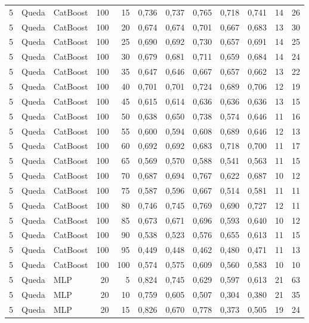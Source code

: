 \begin{longtable}{@{}rllrrrrrrrrr@{}}
5 & Queda & CatBoost & 100 & 15 & 0,736 & 0,737 & 0,765 & 0,718 & 0,741 & 14 & 26 \\
5 & Queda & CatBoost & 100 & 20 & 0,674 & 0,674 & 0,701 & 0,667 & 0,683 & 13 & 30 \\
5 & Queda & CatBoost & 100 & 25 & 0,690 & 0,692 & 0,730 & 0,657 & 0,691 & 14 & 25 \\
5 & Queda & CatBoost & 100 & 30 & 0,679 & 0,681 & 0,711 & 0,659 & 0,684 & 14 & 24 \\
5 & Queda & CatBoost & 100 & 35 & 0,647 & 0,646 & 0,667 & 0,657 & 0,662 & 13 & 22 \\
5 & Queda & CatBoost & 100 & 40 & 0,701 & 0,701 & 0,724 & 0,689 & 0,706 & 12 & 19 \\
5 & Queda & CatBoost & 100 & 45 & 0,615 & 0,614 & 0,636 & 0,636 & 0,636 & 13 & 15 \\
5 & Queda & CatBoost & 100 & 50 & 0,638 & 0,650 & 0,738 & 0,574 & 0,646 & 11 & 16 \\
5 & Queda & CatBoost & 100 & 55 & 0,600 & 0,594 & 0,608 & 0,689 & 0,646 & 12 & 13 \\
5 & Queda & CatBoost & 100 & 60 & 0,692 & 0,692 & 0,683 & 0,718 & 0,700 & 11 & 17 \\
5 & Queda & CatBoost & 100 & 65 & 0,569 & 0,570 & 0,588 & 0,541 & 0,563 & 11 & 15 \\
5 & Queda & CatBoost & 100 & 70 & 0,687 & 0,694 & 0,767 & 0,622 & 0,687 & 10 & 12 \\
5 & Queda & CatBoost & 100 & 75 & 0,587 & 0,596 & 0,667 & 0,514 & 0,581 & 11 & 11 \\
5 & Queda & CatBoost & 100 & 80 & 0,746 & 0,745 & 0,769 & 0,690 & 0,727 & 12 & 11 \\
5 & Queda & CatBoost & 100 & 85 & 0,673 & 0,671 & 0,696 & 0,593 & 0,640 & 10 & 12 \\
5 & Queda & CatBoost & 100 & 90 & 0,538 & 0,523 & 0,576 & 0,655 & 0,613 & 11 & 15 \\
5 & Queda & CatBoost & 100 & 95 & 0,449 & 0,448 & 0,462 & 0,480 & 0,471 & 11 & 13 \\
5 & Queda & CatBoost & 100 & 100 & 0,574 & 0,575 & 0,609 & 0,560 & 0,583 & 10 & 10 \\
5 & Queda & MLP & 20 & 5 & 0,824 & 0,745 & 0,629 & 0,597 & 0,613 & 21 & 63 \\
5 & Queda & MLP & 20 & 10 & 0,759 & 0,605 & 0,507 & 0,304 & 0,380 & 21 & 35 \\
5 & Queda & MLP & 20 & 15 & 0,826 & 0,670 & 0,778 & 0,373 & 0,505 & 19 & 24 \\

\end{longtable}
